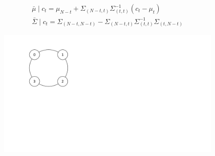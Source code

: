 \documentclass[format=acmsmall, review=false]{acmart}
\begin{document}
\begin{align*}
\bar{\mu} \mid c_t = \mu_{N-t} + \Sigma_{(N-t,t)} \Sigma_{(t,t)}^{-1}(c_t - \mu_t) \\
\bar{\Sigma} \mid c_t = \Sigma_{(N-t,N-t)} - \Sigma_{(N-t,t)} \Sigma_{(t,t)}^{-1} \Sigma_{(t,N-t)}
\end{align*}
\begin{figure}[t]
\includegraphics[width=.3\linewidth]{figures/Example-Bubbles.pdf}
\label{fig:illustrative_example}
\end{figure}
\end{document}
